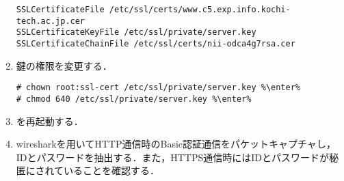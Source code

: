 \documentclass{jlreq}
\begin{document}
\begin{enumerate}
          \begin{lstlisting}[style=file,caption={\ttfamily /etc/apache2/sites-enabled/default-ssl.conf}]
SSLCertificateFile /etc/ssl/certs/www.c5.exp.info.kochi-tech.ac.jp.cer
SSLCertificateKeyFile /etc/ssl/private/server.key
SSLCertificateChainFile /etc/ssl/certs/nii-odca4g7rsa.cer
\end{lstlisting}
    \item 鍵の権限を変更する．
          \begin{lstlisting}
# chown root:ssl-cert /etc/ssl/private/server.key %\enter%
# chmod 640 /etc/ssl/private/server.key %\enter%
\end{lstlisting}
    \item \apache を再起動する．
    \item wiresharkを用いてHTTP通信時のBasic認証通信をパケットキャプチャし，IDとパスワードを抽出する．また，HTTPS通信時にはIDとパスワードが秘匿にされていることを確認する．
\end{enumerate}
\end{document}

